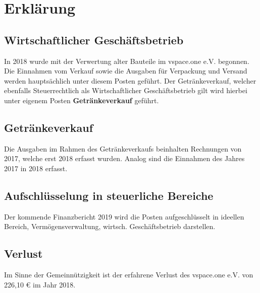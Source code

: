 \documentclass{scrartcl}%
\begin{document}
\section{Erklärung}
\subsection{Wirtschaftlicher Geschäftsbetrieb}
In 2018 wurde mit der Verwertung alter Bauteile im vspace.one e.V. begonnen.
Die Einnahmen vom Verkauf sowie die Ausgaben für Verpackung und Versand werden hauptsächlich unter diesem Posten
geführt.
Der Getränkeverkauf, welcher ebenfalls Steuerrechtlich als Wirtschaftlicher Geschäftsbetrieb gilt 
wird hierbei unter eigenem Posten \textbf{Getränkeverkauf} geführt.

\subsection{Getränkeverkauf}
Die Ausgaben im Rahmen des Getränkeverkaufs beinhalten Rechnungen von 2017, welche erst 2018 erfasst wurden.
Analog sind die Einnahmen des Jahres 2017 in 2018 erfasst.

\subsection{Aufschlüsselung in steuerliche Bereiche}
Der kommende Finanzbericht 2019 wird die Posten aufgeschlüsselt in ideellen Bereich, Vermögensverwaltung, 
wirtsch. Geschäftsbetrieb darstellen.

\subsection{Verlust}
Im Sinne der Gemeinnützigkeit ist der erfahrene Verlust des vspace.one e.V. von 226,10 € im Jahr 2018.
\end{document}
